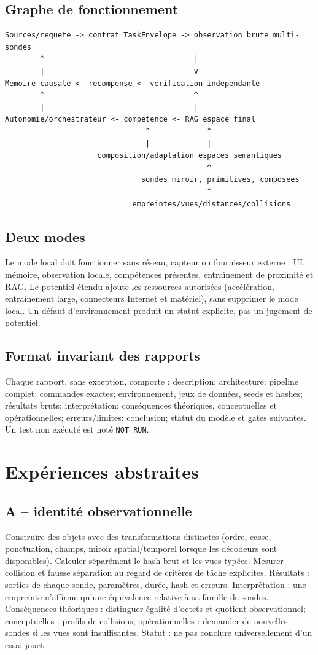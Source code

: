 \documentclass[11pt,a4paper]{report}
\begin{document}
\section{Graphe de fonctionnement}
\begin{lstlisting}
Sources/requete -> contrat TaskEnvelope -> observation brute multi-sondes
        ^                                  |
        |                                  v
Memoire causale <- recompense <- verification independante
        ^                                  ^
        |                                  |
Autonomie/orchestrateur <- competence <- RAG espace final
                                ^             ^
                                |             |
                     composition/adaptation espaces semantiques
                                              ^
                               sondes miroir, primitives, composees
                                              ^
                             empreintes/vues/distances/collisions
\end{lstlisting}
\section{Deux modes}Le mode local doit fonctionner sans réseau, capteur ou fournisseur externe : UI, mémoire, observation locale, compétences présentes, entraînement de proximité et RAG. Le potentiel étendu ajoute les ressources autorisées (accélération, entraînement large, connecteurs Internet et matériel), sans supprimer le mode local. Un défaut d'environnement produit un statut explicite, pas un jugement de potentiel.
\section{Format invariant des rapports}Chaque rapport, sans exception, comporte : description; architecture; pipeline complet; commandes exactes; environnement, jeux de données, seeds et hashes; résultats bruts; interprétation; conséquences théoriques, conceptuelles et opérationnelles; erreurs/limites; conclusion; statut du modèle et gates suivantes. Un test non exécuté est noté \texttt{NOT\_RUN}.
\chapter{Expériences abstraites}
\section{A -- identité observationnelle}Construire des objets avec des transformations distinctes (ordre, casse, ponctuation, champs, miroir spatial/temporel lorsque les décodeurs sont disponibles). Calculer séparément le hash brut et les vues typées. Mesurer collision et fausse séparation au regard de critères de tâche explicites. Résultats : sorties de chaque sonde, paramètres, durée, hash et erreurs. Interprétation : une empreinte n'affirme qu'une équivalence relative à sa famille de sondes. Conséquences théoriques : distinguer égalité d'octets et quotient observationnel; conceptuelles : profils de collisions; opérationnelles : demander de nouvelles sondes si les vues sont insuffisantes. Statut : ne pas conclure universellement d'un essai jouet.
\end{document}
